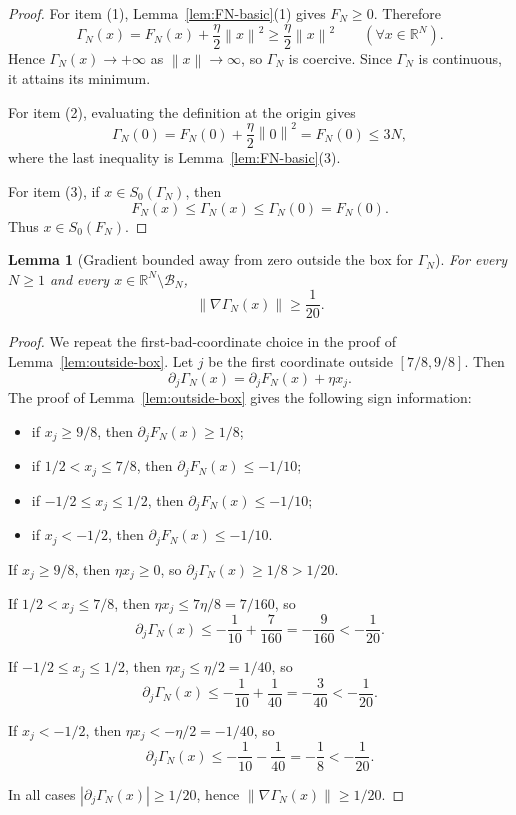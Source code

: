 \documentclass[11pt]{article}
\newtheorem{lemma}[theorem]{Lemma}
\newcommand{\R}{\mathbb{R}}
\newcommand{\norm}[1]{\left\lVert #1\right\rVert}
\begin{document}
\begin{proof}
For item (1), Lemma~\ref{lem:FN-basic}(1) gives \(F_N\ge 0\). Therefore
\[
\Gamma_N(x)=F_N(x)+\frac{\eta}{2}\norm{x}^2\ge \frac{\eta}{2}\norm{x}^2
\qquad
(\forall x\in\R^N).
\]
Hence $\Gamma_N(x)\to +\infty$ as $\norm{x}\to\infty$, so $\Gamma_N$ is coercive. Since \(\Gamma_N\) is continuous,
it attains its minimum.

For item (2), evaluating the definition at the origin gives
\[
\Gamma_N(0)=F_N(0)+\frac{\eta}{2}\norm{0}^2=F_N(0)\le 3N,
\]
where the last inequality is Lemma~\ref{lem:FN-basic}(3).

For item (3), if $x\in S_0(\Gamma_N)$, then
\[
F_N(x)\le \Gamma_N(x)\le \Gamma_N(0)=F_N(0).
\]
Thus $x\in S_0(F_N)$.
\end{proof}

\begin{lemma}[Gradient bounded away from zero outside the box for $\Gamma_N$]
\label{lem:Gamma-outside-box}
For every $N\ge 1$ and every $x\in \R^N\setminus \mathcal B_N$,
\[
\norm{\nabla \Gamma_N(x)}\ge \frac{1}{20}.
\]
\end{lemma}

\begin{proof}
We repeat the first-bad-coordinate choice in the proof of Lemma~\ref{lem:outside-box}.
Let $j$ be the first coordinate outside $[7/8,9/8]$.
Then
\[
\partial_j \Gamma_N(x)=\partial_j F_N(x)+\eta x_j.
\]
The proof of Lemma~\ref{lem:outside-box} gives the following sign information:
\begin{itemize}[leftmargin=1.5em]
    \item if $x_j\ge 9/8$, then $\partial_j F_N(x)\ge 1/8$;
    \item if $1/2<x_j\le 7/8$, then $\partial_j F_N(x)\le -1/10$;
    \item if $-1/2\le x_j\le 1/2$, then $\partial_j F_N(x)\le -1/10$;
    \item if $x_j< -1/2$, then $\partial_j F_N(x)\le -1/10$.
\end{itemize}

If $x_j\ge 9/8$, then $\eta x_j\ge 0$, so $\partial_j \Gamma_N(x)\ge 1/8>1/20$.

If $1/2<x_j\le 7/8$, then $\eta x_j\le 7\eta/8=7/160$, so
\[
\partial_j \Gamma_N(x)\le -\frac{1}{10}+\frac{7}{160}=-\frac{9}{160}<-\frac{1}{20}.
\]

If $-1/2\le x_j\le 1/2$, then $\eta x_j\le \eta/2=1/40$, so
\[
\partial_j \Gamma_N(x)\le -\frac{1}{10}+\frac{1}{40}=-\frac{3}{40}<-\frac{1}{20}.
\]

If $x_j< -1/2$, then $\eta x_j< -\eta/2=-1/40$, so
\[
\partial_j \Gamma_N(x)\le -\frac{1}{10}-\frac{1}{40}=-\frac18<-\frac{1}{20}.
\]

In all cases $|\partial_j \Gamma_N(x)|\ge 1/20$, hence $\norm{\nabla \Gamma_N(x)}\ge 1/20$.
\end{proof}
\end{document}
